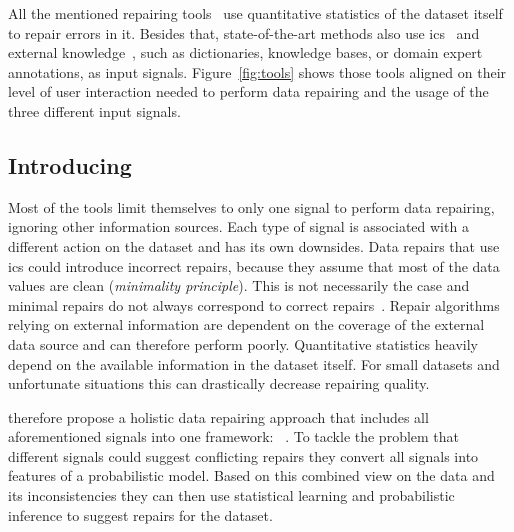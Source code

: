   All the mentioned repairing tools~\cite{scare,potters_wheel,data_wrangler,trifacta_wrangler} use quantitative statistics of the dataset itself to repair errors in it.
  Besides that, state-of-the-art methods also use \glspl{ic}~\cite{holistic,ajax,gdr,editing_rules,data_tamer} and external knowledge~\cite{katara}, such as dictionaries, knowledge bases, or domain expert annotations, as input signals.
  Figure~\ref{fig:tools} shows those tools aligned on their level of user interaction needed to perform data repairing and the usage of the three different input signals.

  \begin{figure*}
    \centering
    
    \caption{Data Repairing Tools in Context}
    \label{fig:tools}
  \end{figure*}


  \subsection{Introducing \holoclean{}}
  Most of the tools limit themselves to only one signal to perform data repairing, ignoring other information sources.
  Each type of signal is associated with a different action on the dataset and has its own downsides.
  Data repairs that use \glspl{ic} could introduce incorrect repairs, because they assume that most of the data values are clean (\textit{minimality principle}).
  This is not necessarily the case and minimal repairs do not always correspond to correct repairs~\cite{holoclean}.
  Repair algorithms relying on external information are dependent on the coverage of the external data source and can therefore perform poorly.
  Quantitative statistics heavily depend on the available information in the dataset itself.
  For small datasets and unfortunate situations this can drastically decrease repairing quality.
  
  \citeauthor{holoclean} therefore propose a holistic data repairing approach that includes all aforementioned signals into one framework: \holoclean{}~\cite{holoclean}.
  To tackle the problem that different signals could suggest conflicting repairs they convert all signals into features of a probabilistic model.
  Based on this combined view on the data and its inconsistencies they can then use statistical learning and probabilistic inference to suggest repairs for the dataset.
  
